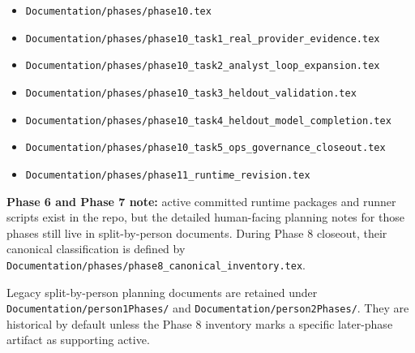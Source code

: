 \documentclass{article}
\begin{document}
\begin{itemize}
\item \texttt{Documentation/phases/phase10.tex}
\item \texttt{Documentation/phases/phase10\_task1\_real\_provider\_evidence.tex}
\item \texttt{Documentation/phases/phase10\_task2\_analyst\_loop\_expansion.tex}
\item \texttt{Documentation/phases/phase10\_task3\_heldout\_validation.tex}
\item \texttt{Documentation/phases/phase10\_task4\_heldout\_model\_completion.tex}
\item \texttt{Documentation/phases/phase10\_task5\_ops\_governance\_closeout.tex}
\item \texttt{Documentation/phases/phase11\_runtime\_revision.tex}
\end{itemize}

\textbf{Phase 6 and Phase 7 note:} active committed runtime packages and runner
scripts exist in the repo, but the detailed human-facing planning notes for
those phases still live in split-by-person documents. During Phase 8 closeout,
their canonical classification is defined by
\texttt{Documentation/phases/phase8\_canonical\_inventory.tex}.

Legacy split-by-person planning documents are retained under
\texttt{Documentation/person1Phases/} and
\texttt{Documentation/person2Phases/}. They are historical by default unless
the Phase 8 inventory marks a specific later-phase artifact as supporting
active.
\end{document}
